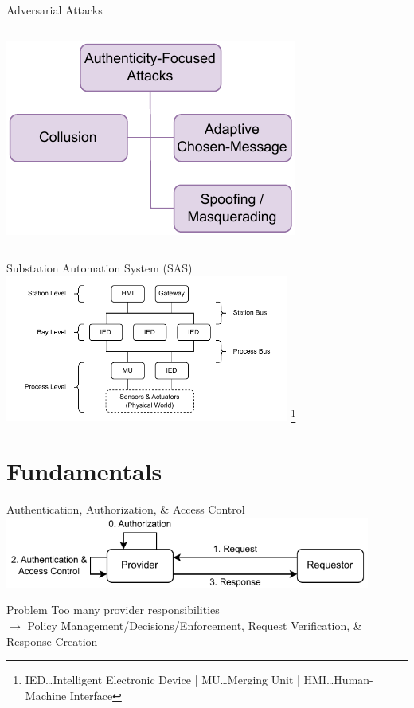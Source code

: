 \documentclass[en]{sdqbeamer}
\newcommand\nonumberfootnote[1]{%
  \begingroup
  \renewcommand\thefootnote{}\footnote{#1}%
  \addtocounter{footnote}{-1}%
  \endgroup
}
\begin{document}
\begin{frame}{Adversarial Attacks}
\begin{columns}
        \centering
        \includegraphics[width=\linewidth]{figures/attacks_authenticity.drawio.pdf}
    \end{columns}
\end{frame}
\begin{frame}{Substation Automation System (SAS)}
    \centering
    \includegraphics[width=0.7\textwidth]{./figures/substation_architecture.drawio.pdf}
    \nonumberfootnote{IED\dots Intelligent Electronic Device | MU\dots Merging Unit | HMI\dots Human-Machine Interface}
\end{frame}

\section{Fundamentals}
\begin{frame}{Authentication, Authorization, \& Access Control}
    \centering
	\includegraphics[width=0.9\textwidth]{./figures/access_control_request_traditional.drawio.pdf}
    \begin{redblock}{Problem}
        Too many provider responsibilities
        \\$\rightarrow$ Policy Management/Decisions/Enforcement, Request Verification, \& Response Creation
    \end{redblock}
\end{frame}
\end{document}
